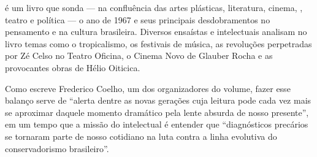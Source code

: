 \medskip

 é um livro que sonda --- na confluência das artes plásticas, literatura, cinema, , teatro e política --- o ano de 1967 e seus principais desdobramentos no pensamento e na cultura brasileira. Diversos ensaístas e intelectuais analisam no livro temas como o tropicalismo, os festivais de música, as revoluções perpetradas por Zé Celso no Teatro Oficina, o Cinema Novo de Glauber Rocha e as provocantes obras de Hélio Oiticica.

 Como escreve Frederico Coelho, um dos organizadores do volume, fazer esse balanço serve de “alerta dentre as novas gerações cuja leitura pode cada vez mais se aproximar daquele momento dramático pela lente absurda de nosso presente”, em um tempo que a missão do intelectual é entender que “diagnósticos precários se tornaram parte de nosso cotidiano na luta contra a linha evolutiva do conservadorismo brasileiro”.


\vfill
\enlargethispage{\baselineskip}

\hspace*{-.4cm}\begin{minipage}[c]{1\linewidth}
\small{
{}}
\end{minipage}

\pagebreak

\pagestyle{circuitocat}

